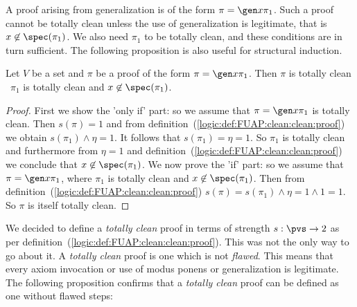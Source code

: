 A proof arising from generalization is of the form $\pi=\gen
x\pi_{1}$. Such a proof cannot be totally clean unless the use of
generalization is legitimate, that is $x\not\in\spec(\pi_{1})$. We
also need $\pi_{1}$ to be totally clean, and these conditions are in
turn sufficient. The following proposition is also useful for
structural induction.

\begin{prop}\label{logic:prop:FUAP:clean:generalization}
Let $V$ be a set and $\pi$ be a proof of the form $\pi=\gen
x\pi_{1}$. Then $\pi$ is totally clean \ifand\ $\pi_{1}$ is totally
clean and $x\not\in\spec(\pi_{1})$.
\end{prop}
\begin{proof}
First we show the 'only if' part: so we assume that $\pi=\gen
x\pi_{1}$ is totally clean. Then $s(\pi)=1$ and from
definition~(\ref{logic:def:FUAP:clean:clean:proof}) we obtain
$s(\pi_{1})\land\eta=1$. It follows that $s(\pi_{1})=\eta=1$. So
$\pi_{1}$ is totally clean and furthermore from $\eta=1$ and
definition~(\ref{logic:def:FUAP:clean:clean:proof}) we conclude that
$x\not\in\spec(\pi_{1})$. We now prove the 'if' part: so we assume
that $\pi=\gen x\pi_{1}$, where $\pi_{1}$ is totally clean and
$x\not\in\spec(\pi_{1})$. Then from
definition~(\ref{logic:def:FUAP:clean:clean:proof})
$s(\pi)=s(\pi_{1})\land\eta=1\land 1=1$. So $\pi$ is itself totally
clean.
\end{proof}

We decided to define a {\em totally clean} proof in terms of
strength $s:\pvs\to 2$ as per
definition~(\ref{logic:def:FUAP:clean:clean:proof}). This was not
the only way to go about it. A {\em totally clean} proof is one
which is not {\em flawed}. This means that every axiom invocation or
use of modus ponens or generalization is legitimate. The following
proposition confirms that a {\em totally clean} proof can be defined
as one without flawed steps:

